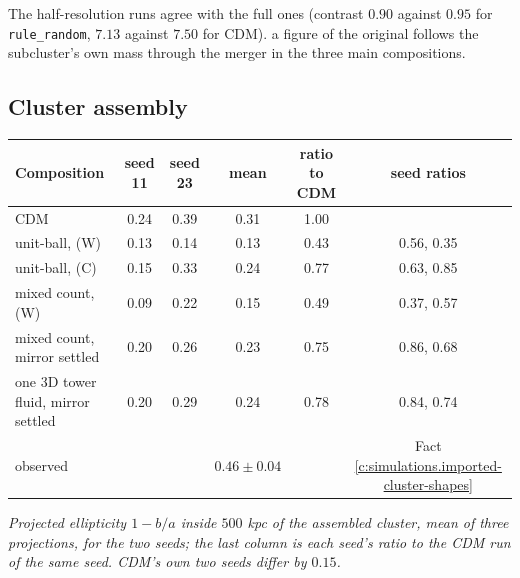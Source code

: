 \documentclass[11pt]{article}
\theoremstyle{definition}
\theoremstyle{plain}
\begin{document}
\label{c:note.simulations.setting-merger-3}
The half-resolution runs agree with the full ones (contrast $0.90$ against $0.95$ for \texttt{rule\_random}, $7.13$ against $7.50$ for CDM). a figure of the original follows the subcluster's own mass through the merger in the three main compositions.

\subsection*{Cluster assembly}
\label{c:note.simulations.setting-cluster-assembly-2}
\centering  
\begin{tabular}{@{}lccccc@{}}
\toprule
Composition & seed 11 & seed 23 & mean & ratio to CDM & seed ratios \\
\midrule
CDM & 0.24 & 0.39 & 0.31 & 1.00 & \\
unit-ball, (W) & 0.13 & 0.14 & 0.13 & 0.43 & 0.56, 0.35 \\
unit-ball, (C) & 0.15 & 0.33 & 0.24 & 0.77 & 0.63, 0.85 \\
mixed count, (W) & 0.09 & 0.22 & 0.15 & 0.49 & 0.37, 0.57 \\
mixed count, mirror settled & 0.20 & 0.26 & 0.23 & 0.75 & 0.86, 0.68 \\
one 3D tower fluid, mirror settled & 0.20 & 0.29 & 0.24 & 0.78 & 0.84, 0.74 \\
\midrule
observed & & & $0.46 \pm 0.04$ & & Fact \ref{c:simulations.imported-cluster-shapes} \\
\bottomrule
\end{tabular}

\emph{Projected ellipticity $1 - b/a$ inside $500$ kpc of the assembled cluster, mean of three projections, for the two seeds; the last column is each seed's ratio to the CDM run of the same seed. CDM's own two seeds differ by $0.15$.}
\end{document}
